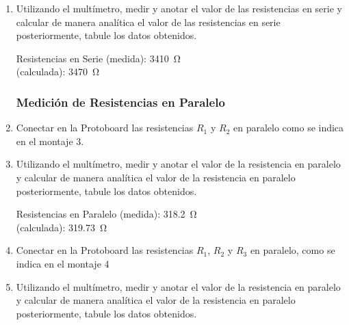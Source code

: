 \documentclass{article}
\begin{document}
\begin{enumerate}

        \item Utilizando el multímetro, medir y anotar el valor de las resistencias en serie y calcular de manera analítica el valor de las resistencias en serie posteriormente, tabule los datos obtenidos.
        
        Resistencias en Serie (medida): \SI{3410}{\ohm}\\
        \hspace*{2.85cm} (calculada): \SI{3470}{\ohm}

        \subsubsection*{Medición de Resistencias en Paralelo}
        \item Conectar en la Protoboard las resistencias $R_1$ y $R_2$ en paralelo como se indica en el montaje 3.
        

        \item Utilizando el multímetro, medir y anotar el valor de la resistencia en paralelo y calcular de manera analítica el valor de la resistencia en paralelo posteriormente, tabule los datos obtenidos.
        
        Resistencias en Paralelo (medida): \SI{318.2}{\ohm}\\
        \hspace*{3.35cm} (calculada): \SI{319.73}{\ohm}

        \item Conectar en la Protoboard las resistencias $R_1$, $R_2$ y $R_3$ en paralelo, como se indica en el montaje 4
        

        \item Utilizando el multímetro, medir y anotar el valor de la resistencia en paralelo y calcular de manera analítica el valor de la resistencia en paralelo posteriormente, tabule los datos obtenidos.


\end{enumerate}
\end{document}
